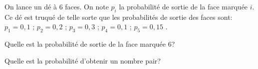 \exo{}

On lance un dé à 6 faces. On note $p_i$ la probabilité de sortie de la face marquée $i$. Ce dé est truqué de telle sorte que les probabilités de sortie des faces sont: $p_1 = 0,1$ ; $p_2 = 0,2$ ; $p_3 = 0,3$ ; $p_4 = 0,1$ ; $p_5 = 0,15$ .

\question{}
Quelle est la probabilité de sortie de la face marquée 6?

\question{}
Quelle est la probabilité d'obtenir un nombre pair?

